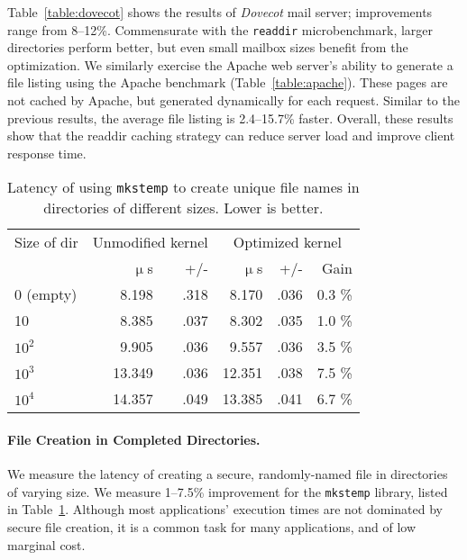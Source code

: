 Table~\ref{table:dovecot} shows the results of {\em Dovecot} mail server; improvements range from 8--12\%.
Commensurate with the {\tt readdir} microbenchmark, larger directories perform better, but even small mailbox sizes benefit from the optimization.
We similarly exercise the Apache web server's ability to generate a file listing using the Apache benchmark (Table~\ref{table:apache}).
These pages are not cached by Apache, but generated dynamically for each request.
Similar to the previous results, the average file listing is 2.4--15.7\% faster. 
Overall, these results show that the readdir caching strategy can reduce server load and improve client response time.

\begin{table}[t]
\scriptsize
\centering
\begin{tabular}{|l|rr|rrr|}
\hline
Size of dir & \multicolumn{2}{c|}{Unmodified kernel} & \multicolumn{3}{c|}{Optimized kernel} \\
& $\upmu$s & +/- & $\upmu$s & +/- & Gain\\
\hline
0 (empty) & 8.198 & .318 & 8.170 & .036 & 0.3 \% \\
\hline
10 & 8.385 & .037 & 8.302 & .035 & 1.0 \% \\
\hline
$10^2$ & 9.905 & .036 & 9.557 & .036 & 3.5 \% \\
\hline
$10^3$ & 13.349 & .036 & 12.351 & .038 & 7.5 \% \\
\hline
$10^4$ & 14.357 & .049 & 13.385 & .041 & 6.7 \% \\
\hline
\end{tabular}
\caption{Latency of using {\tt mkstemp} to create unique file names in directories of different sizes. Lower is better.}
\label{table:lat_mktemp}
\end{table}

\paragraph{File Creation in Completed Directories.}
We measure the latency of creating a secure, randomly-named file in directories of varying size.
We measure 1--7.5\% improvement for the {\tt mkstemp} library, listed in Table~\ref{table:lat_mktemp}. 
Although most applications' execution times are not dominated by secure file creation,
it is a common task for many applications, and of low marginal cost.


